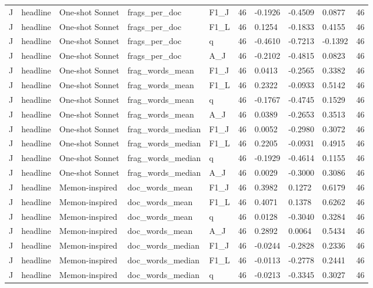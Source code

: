 \begin{table}[t]
{\begin{tabular}{llllllllll}
J & headline & One-shot Sonnet & frags\_per\_doc & F1\_J & 46 & -0.1926 & -0.4509 & 0.0877 & 46 \\
J & headline & One-shot Sonnet & frags\_per\_doc & F1\_L & 46 & 0.1254 & -0.1833 & 0.4155 & 46 \\
J & headline & One-shot Sonnet & frags\_per\_doc & q & 46 & -0.4610 & -0.7213 & -0.1392 & 46 \\
J & headline & One-shot Sonnet & frags\_per\_doc & A\_J & 46 & -0.2102 & -0.4815 & 0.0823 & 46 \\
J & headline & One-shot Sonnet & frag\_words\_mean & F1\_J & 46 & 0.0413 & -0.2565 & 0.3382 & 46 \\
J & headline & One-shot Sonnet & frag\_words\_mean & F1\_L & 46 & 0.2322 & -0.0933 & 0.5142 & 46 \\
J & headline & One-shot Sonnet & frag\_words\_mean & q & 46 & -0.1767 & -0.4745 & 0.1529 & 46 \\
J & headline & One-shot Sonnet & frag\_words\_mean & A\_J & 46 & 0.0389 & -0.2653 & 0.3513 & 46 \\
J & headline & One-shot Sonnet & frag\_words\_median & F1\_J & 46 & 0.0052 & -0.2980 & 0.3072 & 46 \\
J & headline & One-shot Sonnet & frag\_words\_median & F1\_L & 46 & 0.2205 & -0.0931 & 0.4915 & 46 \\
J & headline & One-shot Sonnet & frag\_words\_median & q & 46 & -0.1929 & -0.4614 & 0.1155 & 46 \\
J & headline & One-shot Sonnet & frag\_words\_median & A\_J & 46 & 0.0029 & -0.3000 & 0.3086 & 46 \\
J & headline & Memon-inspired & doc\_words\_mean & F1\_J & 46 & 0.3982 & 0.1272 & 0.6179 & 46 \\
J & headline & Memon-inspired & doc\_words\_mean & F1\_L & 46 & 0.4071 & 0.1378 & 0.6262 & 46 \\
J & headline & Memon-inspired & doc\_words\_mean & q & 46 & 0.0128 & -0.3040 & 0.3284 & 46 \\
J & headline & Memon-inspired & doc\_words\_mean & A\_J & 46 & 0.2892 & 0.0064 & 0.5434 & 46 \\
J & headline & Memon-inspired & doc\_words\_median & F1\_J & 46 & -0.0244 & -0.2828 & 0.2336 & 46 \\
J & headline & Memon-inspired & doc\_words\_median & F1\_L & 46 & -0.0113 & -0.2778 & 0.2441 & 46 \\
J & headline & Memon-inspired & doc\_words\_median & q & 46 & -0.0213 & -0.3345 & 0.3027 & 46 \\

\end{tabular}}
\end{table}
